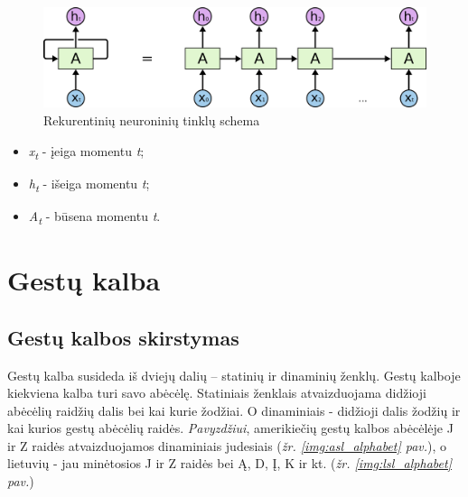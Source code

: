 \documentclass{VUMIFInfKursinis}
\begin{document}
\begin{figure}[H]
	\centering
	\includegraphics[width=.8\linewidth]{img/rnn}
	\caption[]{Rekurentinių neuroninių tinklų schema\footnotemark}
	\label{img:rnn}
\end{figure}
\begin{itemize}
	\item \textit{x\textsubscript{t}} - įeiga momentu \textit{t};
	\item \textit{h\textsubscript{t}} - išeiga momentu \textit{t};
	\item \textit{A\textsubscript{t}} - būsena momentu \textit{t}.
\end{itemize}


\section{Gestų kalba}
\subsection{Gestų kalbos skirstymas}
Gestų kalba susideda iš dviejų dalių – statinių ir dinaminių ženklų. Gestų kalboje kiekviena kalba turi savo abėcėlę. Statiniais ženklais atvaizduojama didžioji abėcėlių raidžių dalis bei kai kurie žodžiai. O dinaminiais - didžioji dalis žodžių ir kai kurios gestų abėcėlių raidės. \textit{Pavyzdžiui}, amerikiečių gestų kalbos abėcėlėje J ir Z raidės atvaizduojamos dinaminiais judesiais (\textit{žr. \ref{img:asl_alphabet} pav.}), o lietuvių - jau minėtosios J ir Z raidės bei Ą, D, Į, K ir kt. (\textit{žr. \ref{img:lsl_alphabet} pav.})
\end{document}
